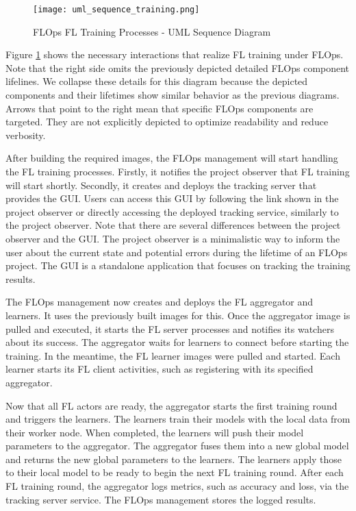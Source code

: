 \begin{figure}[p]
    \begin{adjustwidth}{-0.2\paperwidth}{-0.2\paperwidth}
        \centering
        \texttt{[image: uml\_sequence\_training.png]}
        \caption{FLOps FL Training Processes - UML Sequence Diagram}
        \label{fig:uml_sequence_training}
    \end{adjustwidth}
\end{figure}

Figure \ref{fig:uml_sequence_training} shows the necessary interactions that realize FL training under FLOps.
Note that the right side omits the previously depicted detailed FLOps component lifelines.
We collapse these details for this diagram because the depicted components and their lifetimes show similar behavior as the previous diagrams.
Arrows that point to the right mean that specific FLOps components are targeted.
They are not explicitly depicted to optimize readability and reduce verbosity.

After building the required images, the FLOps management will start handling the FL training processes.
Firstly, it notifies the project observer that FL training will start shortly.
Secondly, it creates and deploys the tracking server that provides the GUI.
Users can access this GUI by following the link shown in the project observer or directly accessing the deployed tracking service, similarly to the project observer.
Note that there are several differences between the project observer and the GUI.
The project observer is a minimalistic way to inform the user about the current state and potential errors during the lifetime of an FLOps project.
The GUI is a standalone application that focuses on tracking the training results.

The FLOps management now creates and deploys the FL aggregator and learners.
It uses the previously built images for this.
Once the aggregator image is pulled and executed, it starts the FL server processes and notifies its watchers about its success.
The aggregator waits for learners to connect before starting the training.
In the meantime, the FL learner images were pulled and started.
Each learner starts its FL client activities, such as registering with its specified aggregator.

Now that all FL actors are ready, the aggregator starts the first training round and triggers the learners.
The learners train their models with the local data from their worker node.
When completed, the learners will push their model parameters to the aggregator.
The aggregator fuses them into a new global model and returns the new global parameters to the learners.
The learners apply those to their local model to be ready to begin the next FL training round.
After each FL training round, the aggregator logs metrics, such as accuracy and loss, via the tracking server service.
The FLOps management stores the logged results.

